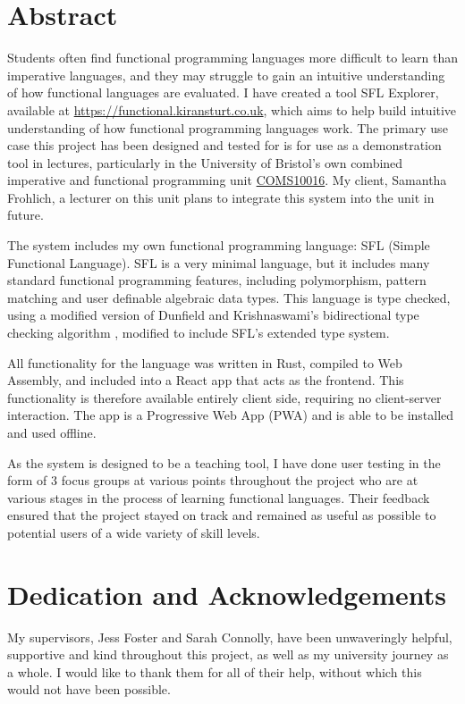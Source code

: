 \chapter*{Abstract}
Students often find functional programming languages more difficult to learn than imperative languages, and they may struggle to gain an intuitive understanding of how functional languages are evaluated. I have created a tool SFL Explorer, available at \href{https://functional.kiransturt.co.uk}{https://functional.kiransturt.co.uk}, which aims to help build intuitive understanding of how functional programming languages work. The primary use case this project has been designed and tested for is for use as a demonstration tool in lectures, particularly in the University of Bristol's own combined imperative and functional programming unit \hyperref[COMS10016]{COMS10016}. My client, Samantha Frohlich, a lecturer on this unit plans to integrate this system into the unit in future. 

The system includes my own functional programming language: SFL (Simple Functional Language). SFL is a very minimal language, but it includes many standard functional programming features, including polymorphism, pattern matching and user definable algebraic data types. This language is type checked, using a modified version of Dunfield and Krishnaswami's bidirectional type checking algorithm \cite{completebidir}, modified to include SFL's extended type system. 

All functionality for the language was written in Rust, compiled to Web Assembly, and included into a React app that acts as the frontend. This functionality is therefore available entirely client side, requiring no client-server interaction. The app is a Progressive Web App (PWA) and is able to be installed and used offline. 

As the system is designed to be a teaching tool, I have done user testing in the form of 3 focus groups at various points throughout the project who are at various stages in the process of learning functional languages. Their feedback ensured that the project stayed on track and remained as useful as possible to potential users of a wide variety of skill levels. 


\chapter*{Dedication and Acknowledgements}
My supervisors, Jess Foster and Sarah Connolly, have been unwaveringly helpful, supportive and kind throughout this project, as well as my university journey as a whole. I would like to thank them for all of their help, without which this would not have been possible. 

